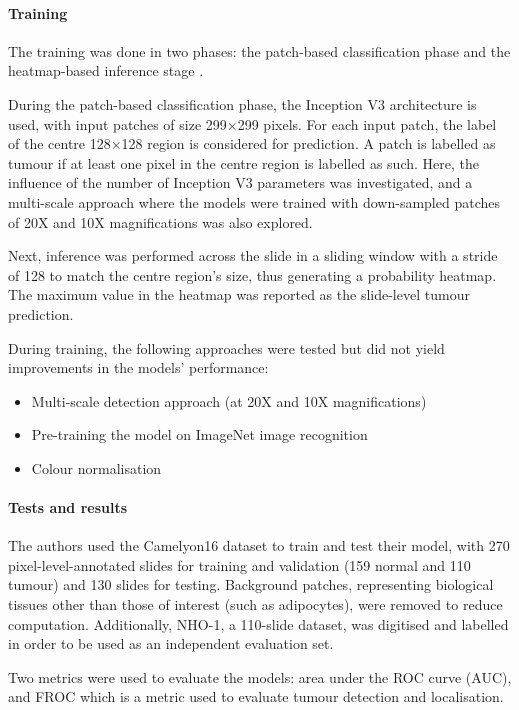 \documentclass{article}
\begin{document}
\paragraph{Training}
The training was done in two phases: the patch-based classification phase and the heatmap-based inference stage \cite{2016arXiv160605718W}.

During the patch-based classification phase, the Inception V3 architecture is used, with input patches of size 299$\times$299 pixels. For each input patch, the label of the centre 128$\times$128 region is considered for prediction. A patch is labelled as tumour if at least one pixel in the centre region is labelled as such. Here, the influence of the number of Inception V3 parameters was investigated, and a multi-scale approach where the models were trained with down-sampled patches of 20X and 10X magnifications was also explored.

Next, inference was performed across the slide in a sliding window with a stride of 128 to match the centre region’s size, thus generating a probability heatmap. The maximum value in the heatmap was reported as the slide-level tumour prediction.

During training, the following approaches were tested but did not yield improvements in the models’ performance:

\begin{itemize}
	\item Multi-scale detection approach (at 20X and 10X magnifications)
	\item Pre-training the model on ImageNet image recognition
	\item Colour normalisation
\end{itemize}

\paragraph{Tests and results}
The authors used the Camelyon16 dataset to train and test their model, with 270 pixel-level-annotated slides for training and validation (159 normal and 110 tumour) and 130 slides for testing. Background patches, representing biological tissues other than those of interest (such as adipocytes), were removed to reduce computation. Additionally, NHO-1, a 110-slide dataset, was digitised and labelled in order to be used as an independent evaluation set.

Two metrics were used to evaluate the models: area under the ROC curve (AUC), and FROC which is a metric used to evaluate tumour detection and localisation.
\end{document}
